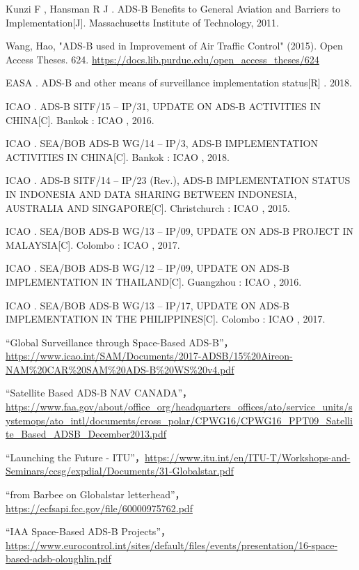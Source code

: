 \begin{thebibliography}{99}
Kunzi F , Hansman R J . ADS-B Benefits to General Aviation and Barriers to Implementation[J]. Massachusetts Institute of Technology, 2011.

Wang, Hao, "ADS-B used in Improvement of Air Traffic Control" (2015). Open Access Theses. 624.
\url{https://docs.lib.purdue.edu/open_access_theses/624}

EASA . ADS-B and other means of surveillance implementation status[R] . 2018.


ICAO . ADS-B SITF/15 – IP/31, UPDATE ON ADS-B ACTIVITIES IN CHINA[C]. Bankok : ICAO , 2016.

ICAO . SEA/BOB ADS-B WG/14 – IP/3, ADS-B IMPLEMENTATION ACTIVITIES IN CHINA[C]. Bankok : ICAO , 2018.

ICAO . ADS-B SITF/14 – IP/23 (Rev.), ADS-B IMPLEMENTATION STATUS IN INDONESIA AND DATA SHARING BETWEEN INDONESIA, AUSTRALIA AND SINGAPORE[C]. Christchurch : ICAO , 2015.

ICAO . SEA/BOB ADS-B WG/13 – IP/09, UPDATE ON ADS-B PROJECT IN MALAYSIA[C]. Colombo : ICAO , 2017.

ICAO . SEA/BOB ADS-B WG/12 – IP/09, UPDATE ON ADS-B IMPLEMENTATION IN THAILAND[C]. Guangzhou : ICAO , 2016.

ICAO . SEA/BOB ADS-B WG/13 – IP/17, UPDATE ON ADS-B IMPLEMENTATION IN THE PHILIPPINES[C]. Colombo : ICAO , 2017.


“Global Surveillance through Space-Based ADS-B”，\url{https://www.icao.int/SAM/Documents/2017-ADSB/15%20Aireon-NAM%20CAR%20SAM%20ADS-B%20WS%20v4.pdf}

“Satellite Based ADS-B NAV CANADA”，\url{https://www.faa.gov/about/office_org/headquarters_offices/ato/service_units/systemops/ato_intl/documents/cross_polar/CPWG16/CPWG16_PPT09_Satellite_Based_ADSB_December2013.pdf}

“Launching the Future - ITU”，\url{https://www.itu.int/en/ITU-T/Workshops-and-Seminars/ccsg/expdial/Documents/31-Globalstar.pdf}

“from Barbee on Globalstar letterhead”，\url{https://ecfsapi.fcc.gov/file/60000975762.pdf}

“IAA Space-Based ADS-B Projects”，\url{https://www.eurocontrol.int/sites/default/files/events/presentation/16-space-based-adsb-oloughlin.pdf}


\end{thebibliography}

